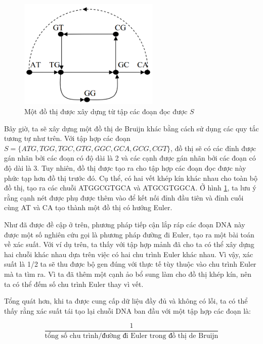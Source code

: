 \documentclass[14pt, a4paper]{article}
\numberwithin{equation}{section}
\numberwithin{figure}{section}
\numberwithin{dl}{section}
\numberwithin{md}{section}
\numberwithin{bd}{section}
\numberwithin{dn}{section}
\numberwithin{hq}{section}
\begin{document}
    \begin{figure}[h!]
        \centering
        \includegraphics[width=0.6\textwidth]{3.png}
        \caption{Một đồ thị được xây dựng từ tập các đoạn đọc được $S$}
        \label{fig:3}
    \end{figure}

    Bây giờ, ta sẽ xây dựng một đồ thị de Bruijn khác bằng cách sử dụng các quy tắc tương tự như trên.
    Với tập hợp các đoạn $S = \lbrace ATG, TGG, TGC, GTG, GGC, GCA, GCG, CGT \rbrace$,
    đồ thị sẽ có các đỉnh được gán nhãn bởi các đoạn có độ dài là 2 và các cạnh được gán nhãn bởi các đoạn có độ dài là 3.
    Tuy nhiên, đồ thị được tạo ra cho tập hợp các đoạn đọc được này phức tạp hơn đồ thị trước đó.
    Cụ thể, có hai vết khép kín khác nhau cho toàn bộ đồ thị, tạo ra các chuỗi ATGGCGTGCA và ATGCGTGGCA.
    Ở hình \ref{fig:3}, ta lưu ý rằng cạnh nét được phụ được thêm vào để kết nối đỉnh đầu tiên và đỉnh cuối cùng AT và CA tạo thành một đồ thị có hướng Euler.

    Như đã được đề cập ở trên, phương pháp tiếp cận lắp ráp các đoạn DNA này được một số nghiên cứu gọi là phương pháp đường đi Euler, tạo ra một bài toán về xác suất.
    Với ví dụ trên, ta thấy với tập hợp mảnh đã cho ta có thể xây dựng hai chuỗi khác nhau dựa trên việc có hai chu trình Euler khác nhau.
    Vì vậy, xác suất là 1/2 ta sẽ thu được bộ gen đúng với thực tế tùy thuộc vào chu trình Euler mà ta tìm ra.
    Vì ta đã thêm một cạnh ảo bổ sung làm cho đồ thị khép kín, nên ta có thể đếm số chu trình Euler thay vì vết.

    Tổng quát hơn, khi ta được cung cấp dữ liệu đầy đủ và không có lỗi, ta có thể thấy rằng xác suất tái tạo lại chuỗi DNA ban đầu với một tập hợp các đoạn là:

    \begin{equation}
        \dfrac{1}{\text{tổng số chu trình/đường đi Euler trong đồ thị de Bruijn}}
    \end{equation}
\end{document}
